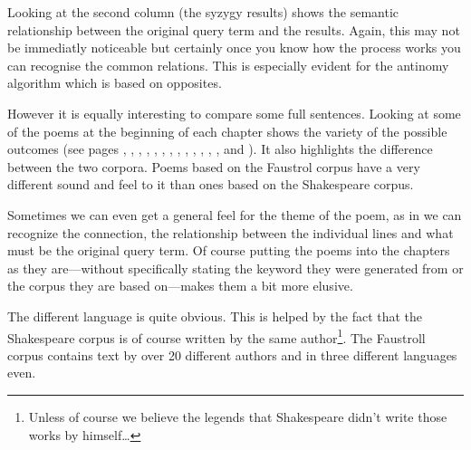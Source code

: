 Looking at the second column (the syzygy results) shows the semantic relationship between the original query term and the results. Again, this may not be immediatly noticeable but certainly once you know how the process works you can recognise the common relations. This is especially evident for the antinomy algorithm which is based on opposites.

\spirals

However it is equally interesting to compare some full sentences. Looking at some of the poems at the beginning of each chapter shows the variety of the possible outcomes (see pages \pageref{ch:introduction}, \pageref{ch:inspirations}, \pageref{ch:methodology}, \pageref{ch:pataphysics}, \pageref{ch:creativity}, \pageref{ch:technology}, \pageref{ch:evaluation}, \pageref{ch:foundations}, \pageref{ch:interpretation}, \pageref{ch:implementation}, \pageref{ch:applications}, \pageref{ch:analysis}, \pageref{ch:aspirations}, and \pageref{ch:observations}). It also highlights the difference between the two corpora. Poems based on the Faustrol corpus have a very different sound and feel to it than ones based on the Shakespeare corpus.


Sometimes we can even get a general feel for the theme of the poem, as in we can recognize the connection, the relationship between the individual lines and what must be the original query term. Of course putting the poems into the chapters as they are---without specifically stating the keyword they were generated from or the corpus they are based on---makes them a bit more elusive.

The different language is quite obvious. This is helped by the fact that the Shakespeare corpus is of course written by the same author\footnote{Unless of course we believe the legends that Shakespeare didn't write those works by himself\ldots}. The Faustroll corpus contains text by over 20 different authors and in three different languages even.

